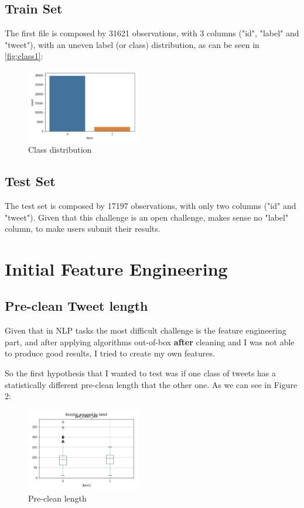 \documentclass{article}
\begin{document}
	\subsection{Train Set}
	
	The first file is composed by 31621 observations, with 3 columns ("id", "label" and "tweet"), with an uneven label (or class) distribution, as can be seen in \autoref{fig:class1}:
	
	\begin{figure}[h!]
		\label{fig:class1}
		\caption{Class distribution}
		\includegraphics[width=50mm]{classes.png}
		\centering
	\end{figure}
	
	\subsection{Test Set}
	
	The test set is composed by 17197 observations, with only two columns ("id" and "tweet"). Given that this challenge is an open challenge, makes sense no "label" column, to make users submit their results. 
	
	\section{Initial Feature Engineering}
	
	\subsection{Pre-clean Tweet length}
	
	Given that in NLP tasks the most difficult challenge is the feature engineering part, and after applying algorithms out-of-box \textbf{after} cleaning and I was not able to produce good results, I tried to create my own features. 
	
	So the first hypothesis that I wanted to test was if one class of tweets has a statistically different pre-clean length that the other one. As we can see in Figure 2:
	
	\begin{figure}[h!]
		\caption{Pre-clean length}
		\includegraphics[width=50mm]{precleanl.png}
		\centering
	\end{figure}
	
\end{document}
